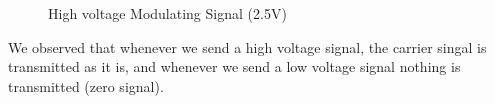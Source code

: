 \documentclass[12pt]{article}
\begin{document}
\begin{figure}[H]
    \centering
    \caption{High voltage Modulating Signal (2.5V)}

\end{figure}
We observed that whenever we send a high voltage signal, the carrier singal is transmitted as it is, and whenever we send a low voltage signal nothing is transmitted (zero signal).
\end{document}
